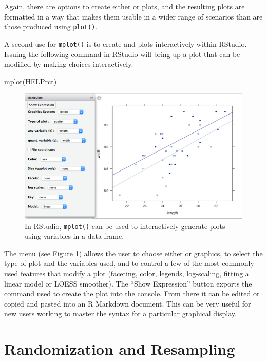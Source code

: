 \noindent
Again, there are options to create either  or 
plots, and the resulting plots are formatted in a way that makes them
usable in a wider range of scenarios than are those produced using
\texttt{plot()}.

A second use for \texttt{mplot()} is to create  and
 plots interactively within RStudio. Issuing the following
command in RStudio will bring up a plot that can be modified by making
choices interactively.

\begin{Schunk}
\begin{Sinput}
mplot(HELPrct)
\end{Sinput}
\end{Schunk}

\begin{figure}
\includegraphics{half-mplot.png}
\caption{In RStudio, \texttt{mplot()} can be used to interactively generate 
plots using variables in a data frame.}
\label{fig:mplot}
\end{figure}

\noindent
The menu (see Figure \ref{fig:mplot}) allows the user to choose either
 or  graphics, to select the type of plot and
the variables used, and to control a few of the most commonly used
features that modify a plot (faceting, color, legends, log-scaling,
fitting a linear model or LOESS smoother). The ``Show Expression''
button exports the command used to create the plot into the console.
From there it can be edited or copied and pasted into an R Markdown
document. This can be very useful for new users working to master the
syntax for a particular graphical display.

\section{Randomization and
Resampling}\label{randomization-and-resampling}

